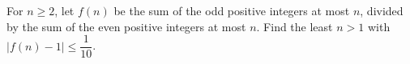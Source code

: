 For $n\ge2$, let $f(n)$ be the sum of the odd positive integers at most $n$, divided by the sum of the even positive integers at most $n$. Find the least $n>1$ with $|f(n)-1|\le\dfrac{1}{10}$.
